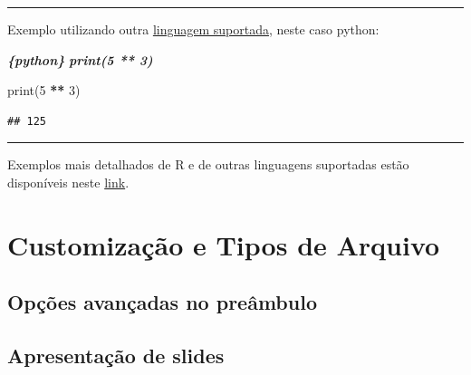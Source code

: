 \documentclass[
]{book}
\newenvironment{Shaded}{\begin{snugshade}}{\end{snugshade}}
\newcommand{\BuiltInTok}[1]{#1}
\newcommand{\DecValTok}[1]{\textcolor[rgb]{0.00,0.00,0.81}{#1}}
\newcommand{\InformationTok}[1]{\textcolor[rgb]{0.56,0.35,0.01}{\textbf{\textit{#1}}}}
\newcommand{\NormalTok}[1]{#1}
\newcommand{\OperatorTok}[1]{\textcolor[rgb]{0.81,0.36,0.00}{\textbf{#1}}}
\begin{document}
\begin{center}\rule{0.5\linewidth}{0.5pt}\end{center}

Exemplo utilizando outra \protect\hyperlink{linguagens-suportadas}{linguagem suportada}, neste caso python:

\begin{Shaded}
\begin{Highlighting}[]
\InformationTok{\textasciigrave{}\textasciigrave{}\textasciigrave{}\{python\}}
\InformationTok{print(5 ** 3)}
\InformationTok{\textasciigrave{}\textasciigrave{}\textasciigrave{}}
\end{Highlighting}
\end{Shaded}

\begin{Shaded}
\begin{Highlighting}[]
\BuiltInTok{print}\NormalTok{(}\DecValTok{5} \OperatorTok{**} \DecValTok{3}\NormalTok{)}
\end{Highlighting}
\end{Shaded}

\begin{verbatim}
## 125
\end{verbatim}

\begin{center}\rule{0.5\linewidth}{0.5pt}\end{center}

Exemplos mais detalhados de R e de outras linguagens suportadas estão disponíveis neste \href{exemplos/104-intro_blocos_de_codigo.html}{link}.

\hypertarget{customizauxe7uxe3o-e-tipos-de-arquivo}{%
\chapter{Customização e Tipos de Arquivo}\label{customizauxe7uxe3o-e-tipos-de-arquivo}}

\hypertarget{opuxe7uxf5es-avanuxe7adas-no-preuxe2mbulo}{%
\section{Opções avançadas no preâmbulo}\label{opuxe7uxf5es-avanuxe7adas-no-preuxe2mbulo}}

\hypertarget{apresentauxe7uxe3o-de-slides}{%
\section{Apresentação de slides}\label{apresentauxe7uxe3o-de-slides}}
\end{document}
